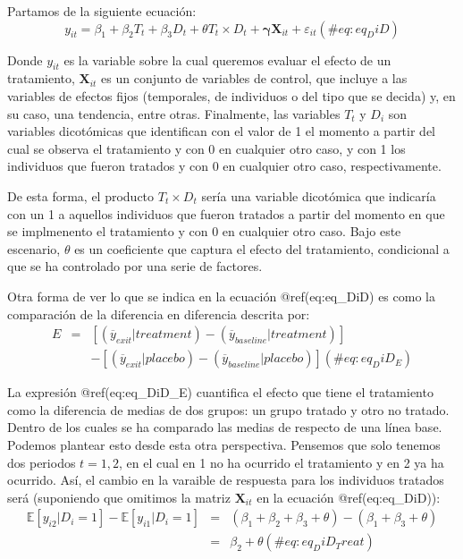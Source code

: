 \documentclass[
]{book}
\begin{document}
Partamos de la siguiente ecuación:
\begin{equation}
    y_{it} = \beta_1 + \beta_2 T_t + \beta_3 D_t + \theta T_t \times D_t + \boldsymbol{\gamma} \mathbf{X}_{it} + \varepsilon_{it}
    (\#eq:eq_DiD)
\end{equation}

Donde \(y_{it}\) es la variable sobre la cual queremos evaluar el efecto de un tratamiento, \(\mathbf{X}_{it}\) es un conjunto de variables de control, que incluye a las variables de efectos fijos (temporales, de individuos o del tipo que se decida) y, en su caso, una tendencia, entre otras. Finalmente, las variables \(T_t\) y \(D_i\) son variables dicotómicas que identifican con el valor de 1 el momento a partir del cual se observa el tratamiento y con 0 en cualquier otro caso, y con 1 los individuos que fueron tratados y con 0 en cualquier otro caso, respectivamente.

De esta forma, el producto \(T_t \times D_t\) sería una variable dicotómica que indicaría con un 1 a aquellos individuos que fueron tratados a partir del momento en que se implmenento el tratamiento y con 0 en cualquier otro caso. Bajo este escenario, \(\theta\) es un coeficiente que captura el efecto del tratamiento, condicional a que se ha controlado por una serie de factores.

Otra forma de ver lo que se indica en la ecuación @ref(eq:eq\_DiD) es como la comparación de la diferencia en diferencia descrita por:
\begin{eqnarray}
    E & = & [ (\overline{y}_{exit} | treatment) - (\overline{y}_{baseline} | treatment) ] \nonumber \\  
    &  & - [ (\overline{y}_{exit} | placebo) - (\overline{y}_{baseline} | placebo) ]
    (\#eq:eq_DiD_E)
\end{eqnarray}

La expresión @ref(eq:eq\_DiD\_E) cuantifica el efecto que tiene el tratamiento como la diferencia de medias de dos grupos: un grupo tratado y otro no tratado. Dentro de los cuales se ha comparado las medias de respecto de una línea base. Podemos plantear esto desde esta otra perspectiva. Pensemos que solo tenemos dos periodos \(t = {1, 2}\), en el cual en 1 no ha ocurrido el tratamiento y en 2 ya ha ocurrido. Así, el cambio en la varaible de respuesta para los individuos tratados será (suponiendo que omitimos la matriz \(\mathbf{X}_{it}\) en la ecuación @ref(eq:eq\_DiD)):
\begin{eqnarray}
    \mathbb{E}[ y_{i2} | D_i = 1 ] - \mathbb{E}[ y_{i1} | D_i = 1 ] & = & ( \beta_1 + \beta_2 + \beta_3 + \theta ) - ( \beta_1 + \beta_3 + \theta ) \nonumber \\  
    & = & \beta_2 + \theta 
    (\#eq:eq_DiD_Treat)
\end{eqnarray}
\end{document}
